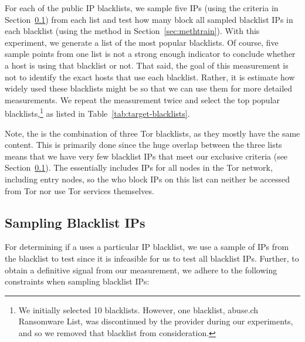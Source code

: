 For each of the public IP blacklists, we sample five IPs (using the criteria
in Section~\ref{sec:methtarg}) from each list and test how many {}
block all sampled blacklist IPs in each blacklist (using the method in
Section~\ref{sec:methtrain}). With this experiment, we
generate a list of the most popular blacklists. Of course, five sample points
from one list is not a strong enough indicator to conclude whether a host is
using that blacklist or not. That said, the goal of this measurement is not to
identify the exact hosts that use each blacklist. Rather, it is
estimate how widely used these blacklists might be so that we can use them for more detailed measurements. We
repeat the measurement twice and select the top {\blacklistnum} popular
blacklists,\footnote{We initially selected 10 blacklists. However, one blacklist,
abuse.ch Ransomware List, was discontinued by the provider during our
experiments, and so we removed that blacklist from consideration.} as listed in
Table~\ref{tab:target-blacklists}.

Note, the {\ettor} is the combination of three Tor blacklists, as they mostly
have the same content. This is primarily done since the huge overlap between
the three lists means that we have very few blacklist IPs that meet our
exclusive criteria (see Section~\ref{sec:methtarg}). The {\ettor} essentially
includes IPs for all nodes in the Tor network, including entry nodes, so the
{} who block IPs on this list can neither be accessed from Tor nor
use Tor services themselves.

\subsection{Sampling Blacklist IPs}
\label{sec:methtarg}

For determining if a {} uses a particular IP blacklist, we use a
sample of IPs from the blacklist to test since it is infeasible for us to
test all blacklist IPs. Further, to obtain a definitive signal from our
measurement, we adhere to the following constraints when sampling blacklist
IPs:

